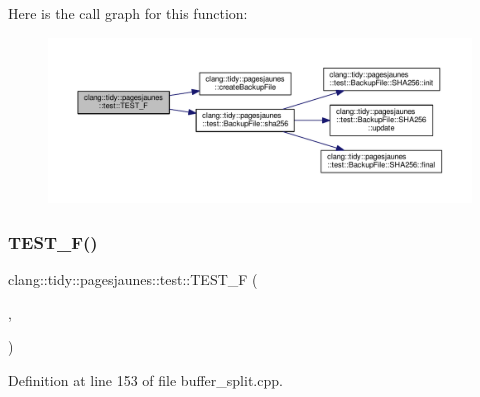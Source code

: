 Here is the call graph for this function\+:
\nopagebreak
\begin{figure}[H]
\begin{center}
\leavevmode
\includegraphics[width=350pt]{namespaceclang_1_1tidy_1_1pagesjaunes_1_1test_ac6667fa9525cf83fa96849105b98ac8e_cgraph}
\end{center}
\end{figure}
\mbox{\label{namespaceclang_1_1tidy_1_1pagesjaunes_1_1test_a8a4e7adcedc9e053673a69f3805513fa}} 
\subsubsection{\texorpdfstring{T\+E\+S\+T\+\_\+\+F()}{TEST\_F()}\hspace{0.1cm}{\footnotesize\ttfamily [36/57]}}
{\footnotesize\ttfamily clang\+::tidy\+::pagesjaunes\+::test\+::\+T\+E\+S\+T\+\_\+F (\begin{DoxyParamCaption}\item[{\hyperlink{classclang_1_1tidy_1_1pagesjaunes_1_1test_1_1_buffer_split_test}{Buffer\+Split\+Test}}]{,  }\item[{One\+Line\+With\+No\+C\+R\+Buffer\+Start\+At1}]{ }\end{DoxyParamCaption})}



Definition at line 153 of file buffer\+\_\+split.\+cpp.

